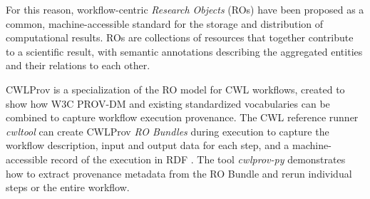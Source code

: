 For this reason, workflow-centric \emph{Research Objects} (ROs) \cite{belhajjameWorkflowcentricResearchObjects2012} have been proposed as a common, machine-accessible standard for the storage and distribution of computational results. ROs are collections of resources that together contribute to a scientific result, with semantic annotations describing the aggregated entities and their relations to each other. %


CWLProv \cite{khanSharingInteroperableWorkflow2019} is a specialization of the RO model for CWL workflows, created to show how W3C PROV-DM \cite{moreauPROVDMPROVData2013} and existing standardized vocabularies can be combined to capture workflow execution provenance. The CWL reference runner \emph{cwltool} \cite{crusoeCommonworkflowlanguageCwltool202305131557342023} can create CWLProv \emph{RO Bundles} during execution to capture the workflow description, input and output data for each step, and a machine-accessible record of the execution in RDF \cite{cyganiakRDFConceptsAbstract2014}. The tool \emph{cwlprov-py} \cite{soiland-reyesCommonworkflowlanguageCwlprovpy2022} demonstrates how to extract provenance metadata from the RO Bundle and rerun individual steps or the entire workflow.


